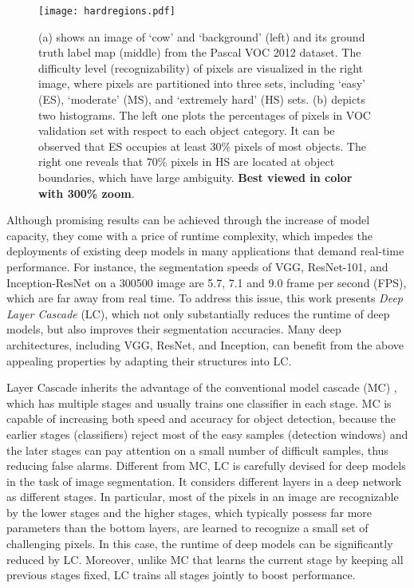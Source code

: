 \documentclass[10pt,twocolumn,letterpaper]{article}
\begin{document}
\begin{figure}[t]
\begin{center}
\texttt{[image: hardregions.pdf]}
\vskip -0.2cm
\caption{\small{(a) shows an image of `cow' and `background' (left) and its ground truth label map (middle) from the Pascal VOC 2012 dataset. The difficulty level (\eg recognizability) of pixels are visualized in the right image, where pixels are partitioned into three sets, including `easy' (ES), `moderate' (MS), and `extremely hard' (HS) sets. (b) depicts two histograms. The left one plots the percentages of pixels in VOC validation set with respect to each object category. It can be observed that ES occupies at least 30\% pixels of most objects. The right one reveals that 70\% pixels in HS are located at object boundaries, which have large ambiguity. \textbf{Best viewed in color with 300\% zoom}.}}
\label{fig:intro}
\vspace{-20pt}
\end{center}
\end{figure}


Although promising results can be achieved through the increase of model capacity, they come with a price of runtime complexity,
which impedes the deployments of existing deep models in many applications that demand real-time performance.
For instance, the segmentation speeds of VGG, ResNet-101, and Inception-ResNet on a 300500 image are 5.7, 7.1 and 9.0 frame per second (FPS), which are far away from real time.
To address this issue, this work presents \emph{Deep Layer Cascade} (LC), which not only substantially reduces the runtime of deep models, but also improves their segmentation accuracies.
Many deep architectures, including VGG, ResNet, and Inception, can benefit from the above appealing properties by adapting their structures into LC.

Layer Cascade inherits the advantage of the conventional model cascade (MC) \cite{li2015convolutional, viola2001rapid}, which has multiple stages and usually trains one classifier in each stage.
MC is capable of increasing both speed and accuracy for object detection, because
the earlier stages (classifiers) reject most of the easy samples (detection windows) and the later stages can pay attention on a small number of difficult samples, thus reducing false alarms.
Different from MC, LC is carefully devised for deep models in the task of image segmentation.
It considers different layers in a deep network as different stages. In particular, most of the pixels in an image are recognizable by the lower stages and the higher stages, which typically possess far more parameters than the bottom layers, are learned to recognize a small set of challenging pixels.
In this case, the runtime of deep models can be significantly reduced by LC.
Moreover, unlike MC that learns the current stage by keeping all previous stages fixed, LC trains all stages jointly to boost performance.
\end{document}

